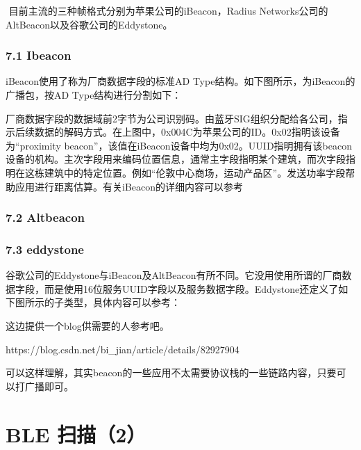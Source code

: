 \documentclass[letterpaper,10pt,english]{sphinxmanual}
\begin{document}
​       目前主流的三种帧格式分别为苹果公司的iBeacon，Radius Networks公司的AltBeacon以及谷歌公司的Eddystone。


\subsection{7.1 Ibeacon}
\label{\detokenize{test/ble_adv_scan_all:ibeacon}}
iBeacon使用了称为厂商数据字段的标准AD Type结构。如下图所示，为iBeacon的广播包，按AD Type结构进行分割如下：



厂商数据字段的数据域前2字节为公司识别码。由蓝牙SIG组织分配给各公司，指示后续数据的解码方式。在上图中，0x004C为苹果公司的ID。0x02指明该设备为“proximity  beacon”，该值在iBeacon设备中均为0x02。UUID指明拥有该beacon设备的机构。主次字段用来编码位置信息，通常主字段指明某个建筑，而次字段指明在这栋建筑中的特定位置。例如“伦敦中心商场，运动产品区”。发送功率字段帮助应用进行距离估算。有关iBeacon的详细内容可以参考


\subsection{7.2 Altbeacon}
\label{\detokenize{test/ble_adv_scan_all:altbeacon}}


\subsection{7.3 eddystone}
\label{\detokenize{test/ble_adv_scan_all:eddystone}}
谷歌公司的Eddystone与iBeacon及AltBeacon有所不同。它没用使用所谓的厂商数据字段，而是使用16位服务UUID字段以及服务数据字段。Eddystone还定义了如下图所示的子类型，具体内容可以参考：


这边提供一个blog供需要的人参考吧。

https://blog.csdn.net/bi\_jian/article/details/82927904

可以这样理解，其实beacon的一些应用不太需要协议栈的一些链路内容，只要可以打广播即可。


\chapter{BLE 扫描（2）}
\label{\detokenize{test/ble_adv_scan_all:ble-2}}
\end{document}
